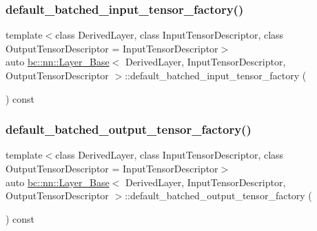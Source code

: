\mbox{\label{structbc_1_1nn_1_1Layer__Base_a08bbf8b1b22ebc0e0f7e848a87b5d2db}} 
\subsubsection{\texorpdfstring{default\+\_\+batched\+\_\+input\+\_\+tensor\+\_\+factory()}{default\_batched\_input\_tensor\_factory()}}
{\footnotesize\ttfamily template$<$class Derived\+Layer, class Input\+Tensor\+Descriptor, class Output\+Tensor\+Descriptor = Input\+Tensor\+Descriptor$>$ \\
auto \hyperlink{structbc_1_1nn_1_1Layer__Base}{bc\+::nn\+::\+Layer\+\_\+\+Base}$<$ Derived\+Layer, Input\+Tensor\+Descriptor, Output\+Tensor\+Descriptor $>$\+::default\+\_\+batched\+\_\+input\+\_\+tensor\+\_\+factory (\begin{DoxyParamCaption}{ }\end{DoxyParamCaption}) const\hspace{0.3cm}{\ttfamily [inline]}}

\mbox{\label{structbc_1_1nn_1_1Layer__Base_a5d2f35ca3f66bc5606751c9c4e45f3df}} 
\subsubsection{\texorpdfstring{default\+\_\+batched\+\_\+output\+\_\+tensor\+\_\+factory()}{default\_batched\_output\_tensor\_factory()}}
{\footnotesize\ttfamily template$<$class Derived\+Layer, class Input\+Tensor\+Descriptor, class Output\+Tensor\+Descriptor = Input\+Tensor\+Descriptor$>$ \\
auto \hyperlink{structbc_1_1nn_1_1Layer__Base}{bc\+::nn\+::\+Layer\+\_\+\+Base}$<$ Derived\+Layer, Input\+Tensor\+Descriptor, Output\+Tensor\+Descriptor $>$\+::default\+\_\+batched\+\_\+output\+\_\+tensor\+\_\+factory (\begin{DoxyParamCaption}{ }\end{DoxyParamCaption}) const\hspace{0.3cm}{\ttfamily [inline]}}

